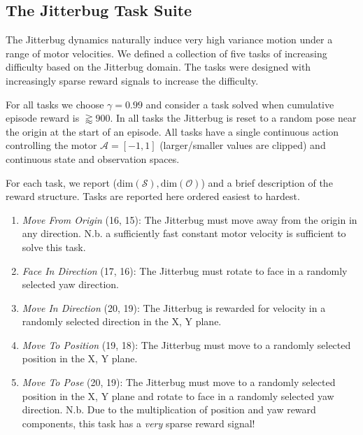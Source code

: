 \documentclass[letterpaper, 10 pt, conference]{ieeeconf}
\begin{document}
\subsection{The Jitterbug Task Suite}

The Jitterbug dynamics naturally induce very high variance motion under a range of motor velocities.
We defined a collection of five tasks of increasing difficulty based on the Jitterbug domain.
The tasks were designed with increasingly sparse reward signals to increase the difficulty.

For all tasks we choose $\gamma = 0.99$ and consider a task solved when cumulative episode reward is $\gtrapprox 900$.
In all tasks the Jitterbug is reset to a random pose near the origin at the start of an episode.
All tasks have a single continuous action controlling the motor $\mathcal{A} = [-1, 1]$ (larger/smaller values are clipped) and continuous state and observation spaces.

For each task, we report ($\text{dim}(\mathcal{S}), \text{dim}(\mathcal{O})$) and a brief description of the reward structure.
Tasks are reported here ordered easiest to hardest.

\begin{enumerate}
    
    \item \emph{Move From Origin} (16, 15): The Jitterbug must move away from the origin in any direction.
    N.b. a sufficiently fast constant motor velocity is sufficient to solve this task.
    
    \item \emph{Face In Direction} (17, 16): The Jitterbug must rotate to face in a randomly selected yaw direction.
    
    \item \emph{Move In Direction} (20, 19): The Jitterbug is rewarded for velocity in a randomly selected direction in the X, Y plane.
    
    \item \emph{Move To Position} (19, 18): The Jitterbug must move to a randomly selected position in the X, Y plane.
    
    \item \emph{Move To Pose} (20, 19): The Jitterbug must move to a randomly selected position in the X, Y plane and rotate to face in a randomly selected yaw direction.
    N.b. Due to the multiplication of position and yaw reward components, this task has a \emph{very} sparse reward signal!
    
\end{enumerate}
\end{document}
